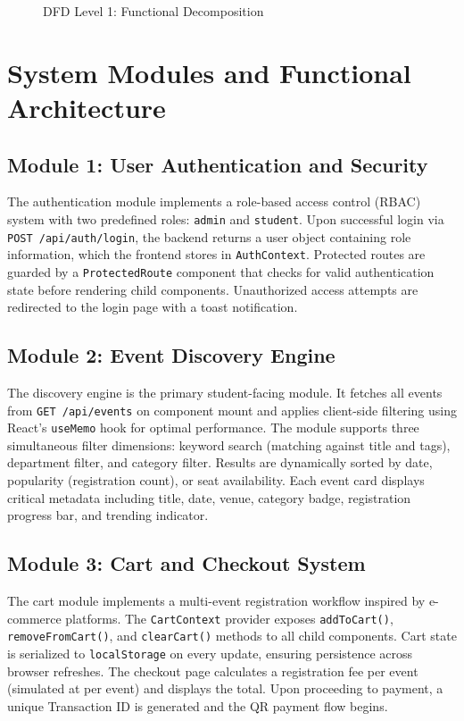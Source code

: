 \begin{figure}[H]
\centering
{}
\caption{DFD Level 1: Functional Decomposition}
\label{fig:dfd1}
\end{figure}

\section{System Modules and Functional Architecture}

\subsection{Module 1: User Authentication and Security}
The authentication module implements a role-based access control (RBAC) system with two predefined roles: \texttt{admin} and \texttt{student}. Upon successful login via \texttt{POST /api/auth/login}, the backend returns a user object containing role information, which the frontend stores in \texttt{AuthContext}. Protected routes are guarded by a \texttt{ProtectedRoute} component that checks for valid authentication state before rendering child components. Unauthorized access attempts are redirected to the login page with a toast notification.

\subsection{Module 2: Event Discovery Engine}
The discovery engine is the primary student-facing module. It fetches all events from \texttt{GET /api/events} on component mount and applies client-side filtering using React's \texttt{useMemo} hook for optimal performance. The module supports three simultaneous filter dimensions: keyword search (matching against title and tags), department filter, and category filter. Results are dynamically sorted by date, popularity (registration count), or seat availability. Each event card displays critical metadata including title, date, venue, category badge, registration progress bar, and trending indicator.

\subsection{Module 3: Cart and Checkout System}
The cart module implements a multi-event registration workflow inspired by e-commerce platforms. The \texttt{CartContext} provider exposes \texttt{addToCart()}, \texttt{removeFromCart()}, and \texttt{clearCart()} methods to all child components. Cart state is serialized to \texttt{localStorage} on every update, ensuring persistence across browser refreshes. The checkout page calculates a registration fee per event (simulated at  per event) and displays the total. Upon proceeding to payment, a unique Transaction ID is generated and the QR payment flow begins.

